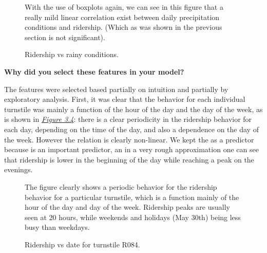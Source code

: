 \documentclass[a4paper,12pt,english]{sphinxmanual}
\begin{document}
\begin{figure}[htbp]
\centering
\capstart

\caption{Ridership vs rainy conditions.}{\small 
With the use of boxplots again, we can see in this figure that a really mild
linear correlation exist between daily precipitation conditions and
ridership. (Which as was shown in the previous section is not significant).
}\label{section2:figure33}\end{figure}

\textbf{Why did you select these features in your model?}

The features were selected based partially on intuition and partially by
exploratory analysis. First, it was clear that the behavior for each individual
turnstile was mainly a function of the hour of the day and the day of the week,
as is shown in {\hyperref[section2:figure34]{\emph{Figure 3.4}}}: there is a clear periodicity in the
ridership behavior for each day, depending on the time of the day, and also a
dependence on the day of the week. However the relation is clearly non-linear.
We kept the  as a predictor because is an important predictor, an in a
very rough approximation one can see that ridership is lower in the beginning
of the day while reaching a peak on the evenings.
\begin{figure}[htbp]
\centering
\capstart

\caption{Ridership vs date for turnstile R084.}{\small 
The figure clearly shows a periodic behavior for the ridership behavior for
a particular turnstile, which is a function mainly of the hour of the day and
day of the week. Ridership peaks are usually seen at 20 hours, while weekends
and holidays (May 30th) being less busy than weekdays.
}\label{section2:figure34}\end{figure}
\end{document}
